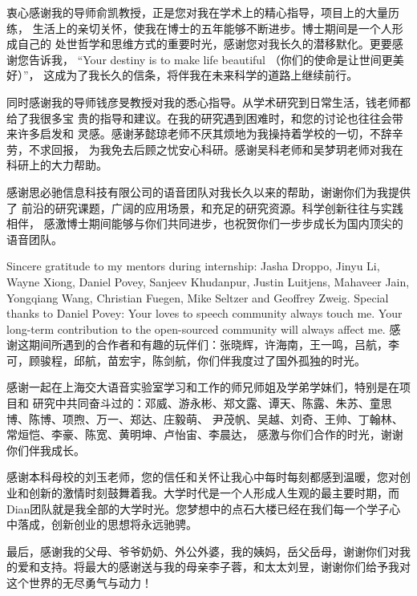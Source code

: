 \begin{thanks}

衷心感谢我的导师俞凯教授，正是您对我在学术上的精心指导，项目上的大量历练，
生活上的亲切关怀，使我在博士的五年能够不断进步。博士期间是一个人形成自己的
处世哲学和思维方式的重要时光，感谢您对我长久的潜移默化。更要感谢您告诉我， 
“Your destiny is to make life beautiful （你们的使命是让世间更美好）”， 
这成为了我长久的信条，将伴我在未来科学的道路上继续前行。

同时感谢我的导师钱彦旻教授对我的悉心指导。从学术研究到日常生活，钱老师都给了我很多宝
贵的指导和建议。在我的研究遇到困难时，和您的讨论也往往会带来许多启发和
灵感。感谢茅懿琼老师不厌其烦地为我操持着学校的一切，不辞辛劳，不求回报，
为我免去后顾之忧安心科研。感谢吴科老师和吴梦玥老师对我在科研上的大力帮助。

感谢思必驰信息科技有限公司的语音团队对我长久以来的帮助，谢谢你们为我提供了
前沿的研究课题，广阔的应用场景，和充足的研究资源。科学创新往往与实践相伴，
感激博士期间能够与你们共同进步，也祝贺你们一步步成长为国内顶尖的语音团队。

Sincere gratitude to my mentors during internship: Jasha Droppo, Jinyu Li, Wayne Xiong, Daniel
Povey, Sanjeev Khudanpur, Justin Luitjens, Mahaveer Jain, Yongqiang Wang, Christian Fuegen, Mike Seltzer and Geoffrey Zweig. Special thanks to Daniel Povey: Your loves to speech community always touch me. Your long-term contribution to the open-sourced community will always affect me. 感谢这期间所遇到的合作者和有趣的玩伴们：张晓辉，许海南，王一鸣，吕航，李可，顾骏程，邱航，苗宏宇，陈剑航，你们伴我度过了国外孤独的时光。

感谢一起在上海交大语音实验室学习和工作的师兄师姐及学弟学妹们，特别是在项目和
研究中共同奋斗过的：邓威、游永彬、郑文露、谭天、陈露、朱苏、童思博、陈博、项煦、万一、郑达、庄毅萌、
尹茂帆、吴越、刘奇、王帅、丁翰林、常烜恺、李豪、陈宽、黄明坤、卢怡宙、李晨达，
感激与你们合作的时光，谢谢你们伴我成长。


感谢本科母校的刘玉老师，您的信任和关怀让我心中每时每刻都感到温暖，您对创业和创新的激情时刻鼓舞着我。大学时代是一个人形成人生观的最主要时期，而Dian团队就是我全部的大学时光。您梦想中的点石大楼已经在我们每一个学子心中落成，创新创业的思想将永远驰骋。

最后，感谢我的父母、爷爷奶奶、外公外婆，我的姨妈，岳父岳母，谢谢你们对我的爱和支持。将最大的感谢送与我的母亲李子蓉，和太太刘昱，谢谢你们给予我对这个世界的无尽勇气与动力！

\end{thanks}
